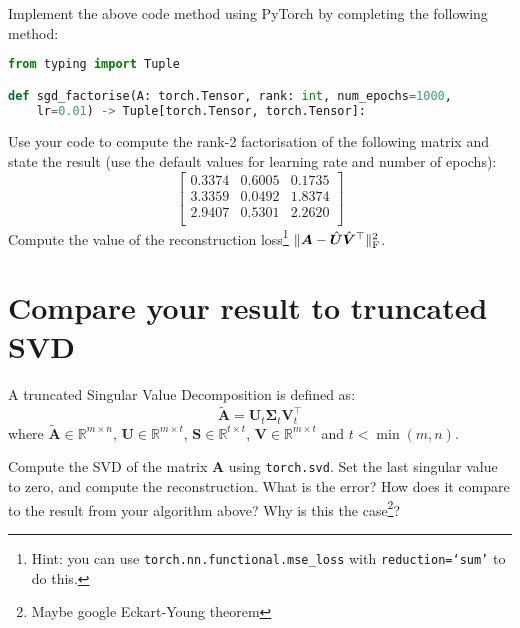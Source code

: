 \documentclass[a4paper]{article}
\begin{document}
\begin{tcolorbox}[title=1.1 Implement gradient-based factorisation (1 mark)]
Implement the above code method using PyTorch by completing the following method:

\begin{lstlisting}[language=Python]
from typing import Tuple

def sgd_factorise(A: torch.Tensor, rank: int, num_epochs=1000, 
	lr=0.01) -> Tuple[torch.Tensor, torch.Tensor]:
\end{lstlisting}

\end{tcolorbox}

\begin{tcolorbox}[title=1.2 Factorise and compute reconstruction error (1 mark)]
Use your code to compute the rank-2 factorisation of the following matrix and state the result (use the default values for learning rate and number of epochs):
\begin{equation*}
	\begin{bmatrix}
		0.3374 & 0.6005 & 0.1735\\
		3.3359 & 0.0492 & 1.8374\\
		2.9407 & 0.5301 & 2.2620\\
	\end{bmatrix}	
\end{equation*}
Compute the value of the reconstruction loss\footnote{Hint: you can use \texttt{torch.nn.functional.mse\_loss} with \texttt{reduction=`sum'} to do this.} $\| \bm A - \hat{\bm U}\hat{\bm V}^\top\|_{\rm F}^2$.
\end{tcolorbox}

\section{Compare your result to truncated SVD}

A truncated Singular Value Decomposition is defined as:
\begin{equation}
	\tilde{\bm A} = \bm U_t \bm \Sigma_t \bm V_t^\top
\end{equation}
where $\tilde{\bm A} \in \mathbb{R}^{m \times n}$, $\bm U \in \mathbb{R}^{m \times t}$, $\bm S \in \mathbb{R}^{t \times t}$, $\bm V \in \mathbb{R}^{m \times t}$ and $t<\min(m,n)$.
\\
\begin{tcolorbox}[title=2.1 Compare to the truncated-SVD (1 mark)]
Compute the SVD of the matrix $\bm A$ using \texttt{torch.svd}. Set the last singular value to zero, and compute the reconstruction. What is the error? How does it compare to the result from your algorithm above? Why is this the case\footnote{Maybe google Eckart-Young theorem}?
\end{tcolorbox}
\end{document}
